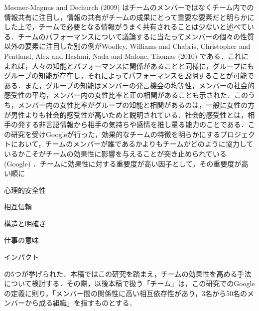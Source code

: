 \documentclass[a4paper, 11pt]{jsarticle}
\begin{document}
Mesmer-Magnus and Dechurch (2009) \cite{Mesmer}はチームのメンバーではなくチーム内での情報共有に注目し，情報の共有がチームの成果にとって重要な要素だと明らかにした上で，チームで必要となる情報がうまく共有されることは少ないと述べている．チームのパフォーマンスについて議論するに当たってメンバーの個々の性質以外の要素に注目した別の例がWoolley, Williams and Chabris, Christopher and Pentland, Alex and Hashmi, Nada and Malone, Thomas (2010) \cite{Woolley}である．これによれば，人々の知能とパフォーマンスに関係があることと同様に，グループにもグループの知能が存在し，それによってパフォーマンスを説明することが可能である．また，グループの知能はメンバーの発言機会の均等性，メンバーの社会的感受性の平均，メンバー内の女性比率と正の相関があることも示された．このうち，メンバー内の女性比率がグループの知能と相関があるのは，一般に女性の方が男性よりも社会的感受性が高いためと説明されている．社会的感受性とは，相手の発する非言語情報から相手の気持ちや感情を推し量る能力のことである．この研究を受けGoogleが行った，効果的なチームの特徴を明らかにするプロジェクトにおいて，チームのメンバーが誰であるかよりもチームがどのように協力しているかこそがチームの効果性に影響を与えることが突き止められている (Google\cite{Google}) ．チームに効果性に対する重要度が高い因子として，その重要度が高い順に
\begin{inparaenum}[1)]
  \item 心理的安全性
  \item 相互信頼
  \item 構造と明確さ
  \item 仕事の意味
  \item インパクト
\end{inparaenum}
の5つが挙げられた．本稿ではこの研究を踏まえ，チームの効果性を高める手法について検討する．その際，以後本稿で扱う「チーム」は，この研究でのGoogleの定義に則り，「メンバー間の関係性に高い相互依存性があり，3名から50名のメンバーから成る組織」を指すものとする．
\end{document}
